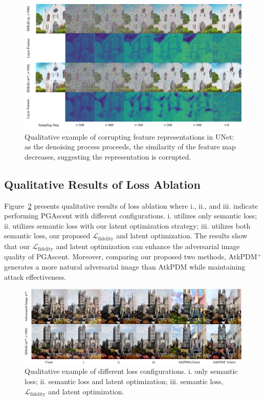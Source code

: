\begin{figure}[h]
\centering
\includegraphics[width=0.9\linewidth]{figures/feature_visulization.pdf}
\caption{Qualitative example of corrupting feature representations in UNet: as the denoising process proceeds, the similarity of the feature map decreases, suggesting the representation is corrupted.}
\label{fig:feature_visulization}
\end{figure}

\subsection{Qualitative Results of Loss Ablation}
Figure~\ref{fig:loss_ablation} presents qualitative results of loss ablation where i., ii., and iii. indicate performing PGAscent with different configurations. i. utilizes only semantic loss; ii. utilizes semantic loss with our latent optimization strategy; iii. utilizes both semantic loss, our proposed $\mathcal{L}_\text{fidelity}$ and latent optimization. The results show that our $\mathcal{L}_\text{fidelity}$ and latent optimization can enhance the adversarial image quality of PGAscent. Moreover, comparing our proposed two methods, AtkPDM$^+$ generates a more natural adversarial image than AtkPDM while maintaining attack effectiveness.

\begin{figure}[h]
\centering
\includegraphics[width=1\linewidth]{figures/loss_ablation.pdf}
\caption{Qualitative example of different loss configurations. i. only semantic loss; ii. semantic loss and latent optimization; iii. semantic loss, $\mathcal{L}_\text{fidelity}$ and latent optimization.}
\label{fig:loss_ablation}
\end{figure}

